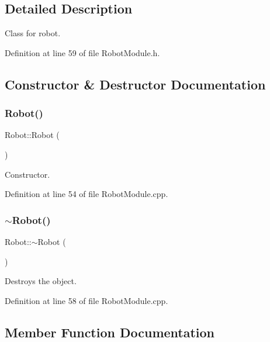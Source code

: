 \subsection{Detailed Description}
Class for robot. 

Definition at line 59 of file Robot\+Module.\+h.



\subsection{Constructor \& Destructor Documentation}
\mbox{\label{class_robot_a4fc7c70ae20623f05e06f2ecb388b6c4}} 
\subsubsection{\texorpdfstring{Robot()}{Robot()}}
{\footnotesize\ttfamily Robot\+::\+Robot (\begin{DoxyParamCaption}{ }\end{DoxyParamCaption})}



Constructor. 



Definition at line 54 of file Robot\+Module.\+cpp.

\mbox{\label{class_robot_a924320124b09c2f2ac1621aa210d5f38}} 
\subsubsection{\texorpdfstring{$\sim$\+Robot()}{~Robot()}}
{\footnotesize\ttfamily Robot\+::$\sim$\+Robot (\begin{DoxyParamCaption}{ }\end{DoxyParamCaption})}



Destroys the object. 



Definition at line 58 of file Robot\+Module.\+cpp.



\subsection{Member Function Documentation}
\mbox{\label{class_robot_a6fc2afb98404e44c737231dbad1f5fe6}} 
